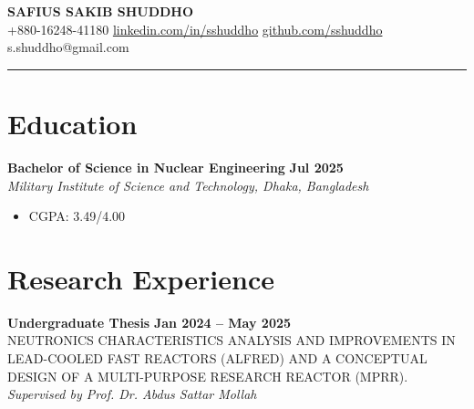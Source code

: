 \documentclass[9pt]{article}
\begin{document}
\begin{center}
    \textbf{\LARGE \MakeUppercase{Safius Sakib Shuddho}} \\[0.2cm]
    \small +880-16248-41180 \quad
    \href{https://linkedin.com/in/sshuddho}{linkedin.com/in/sshuddho} \quad \href{https://github.com/sshuddho}{github.com/sshuddho} \quad s.shuddho@gmail.com 
\end{center}

\hrule \vspace{-6pt}

\section*{Education}
\textbf{Bachelor of Science in Nuclear Engineering} \hfill \textbf{Jul 2025} \\
\textit{Military Institute of Science and Technology, Dhaka, Bangladesh}
\begin{itemize}
    \item CGPA: 3.49/4.00
\end{itemize}

\begin{comment}
\vspace{4pt}
\textbf{Higher Secondary Certificate (HSC)}\hspace{1em}--- \textit{Notre Dame College, Dhaka} \hfill \textbf{2020} \\
GPA: 5.00/5.00 \vspace{4pt} \\
\textbf{Secondary School Certificate (SSC)}\hspace{1.3em}--- \textit{Government Laboratory High School, Dhaka} \hfill \textbf{2018} \\
GPA: 5.00/5.00
\end{comment}


\section*{Research Experience}\vspace{-6pt}
\textbf{Undergraduate Thesis} \hfill \textbf{Jan 2024 -- May 2025}\\
\MakeUppercase{Neutronics Characteristics Analysis and Improvements in Lead-Cooled Fast Reactors (ALFRED) and a Conceptual Design of a Multi-Purpose Research Reactor (MPRR).} \hfill \textit{Supervised by Prof. Dr. Abdus Sattar Mollah}\\
\end{document}
